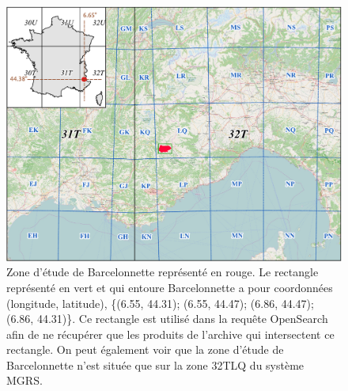 \documentclass[notitlepage]{report}
\begin{document}
\begin{figure}
\centering
\includegraphics[width=\linewidth]{exemple/barc.pdf}
\caption{Zone d'étude de Barcelonnette représenté en rouge. Le rectangle représenté en vert et qui entoure Barcelonnette a pour coordonnées (longitude, latitude), \{(6.55, 44.31); (6.55, 44.47); (6.86, 44.47); (6.86, 44.31)\}. Ce rectangle est utilisé dans la requête OpenSearch afin de ne récupérer que les produits de l'archive qui intersectent ce rectangle. On peut également voir que la zone d'étude de Barcelonnette n'est située que sur la zone 32TLQ du système MGRS.}\label{fig:barc}
\end{figure}
\end{document}
